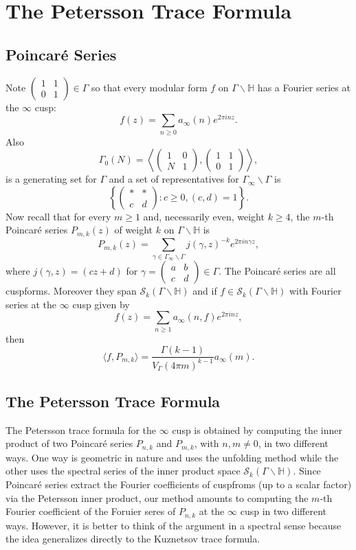 \documentclass[12pt]{book}
\theoremstyle{definition}\newframedtheorem{method}{Method}
\newcommand{\mc}{\mathcal}
\renewcommand{\H}{\mathbb{H}}
\newcommand{\g}{\gamma}
\newcommand{\G}{\Gamma}
\newcommand{\<}{\langle}
\renewcommand{\>}{\rangle}
\newcommand{\GH}{\G\backslash\H}
\newcommand{\GG}{\G_{\infty}\backslash\G}
\begin{document}
  \section{The Petersson Trace Formula}
    \subsection*{Poincar\'e Series}
      Note $\begin{pmatrix} 1 & 1 \\ 0 & 1 \end{pmatrix} \in \G$ so that every modular form $f$ on $\GH$ has a Fourier series at the $\infty$ cusp:
      \[
        f(z) = \sum_{n \ge 0}a_{\infty}(n)e^{2\pi inz}.
      \]
      Also
      \[
        \G_{0}(N) = \left\<\begin{pmatrix} 1 & 0 \\ N & 1 \end{pmatrix},\begin{pmatrix} 1 & 1 \\ 0 & 1 \end{pmatrix}\right\>,
      \]
      is a generating set for $\G$ and a set of representatives for $\GG$ is
      \[
        \left\{\begin{pmatrix} \ast & \ast \\ c & d \end{pmatrix}:c \ge 0, (c,d) = 1 \right\}.
      \]
      Now recall that for every $m \ge 1$ and, necessarily even, weight $k \ge 4$, the $m$-th Poincar\'e series $P_{m,k}(z)$ of weight $k$ on $\GH$ is
      \[
        P_{m,k}(z) = \sum_{\g \in \GG}j(\g,z)^{-k}e^{2\pi in\g z},
      \]
      where $j(\g,z) = (cz+d)$ for $\g = \begin{pmatrix} a & b \\ c & d \end{pmatrix} \in \G$. The Poincar\'e series are all cuspforms. Moreover they span $\mc{S}_{k}(\GH)$ and if $f \in \mc{S}_{k}(\GH)$ with Fourier series at the $\infty$ cusp given by
      \[
        f(z) = \sum_{n \ge 1}a_{\infty}(n,f)e^{2\pi inz},
      \]
      then
      \[
        \<f,P_{m,k}\> = \frac{\G(k-1)}{V_{\G}(4\pi m)^{k-1}}a_{\infty}(m).
      \]
    \subsection*{The Petersson Trace Formula}
      The Petersson trace formula for the $\infty$ cusp is obtained by computing the inner product of two Poincar\'e series $P_{n,k}$ and $P_{m,k}$, with $n,m \neq 0$, in two different ways. One way is geometric in nature and uses the unfolding method while the other uses the spectral series of the inner product space $\mc{S}_{k}(\GH)$. Since Poincar\'e series extract the Fourier coefficients of cuspfroms (up to a scalar factor) via the Petersson inner product, our method amounts to computing the $m$-th Fourier coefficient of the Foruier seres of $P_{n,k}$ at the $\infty$ cusp in two different ways. However, it is better to think of the argument in a spectral sense because the idea generalizes directly to the Kuznetsov trace formula.
\end{document}
